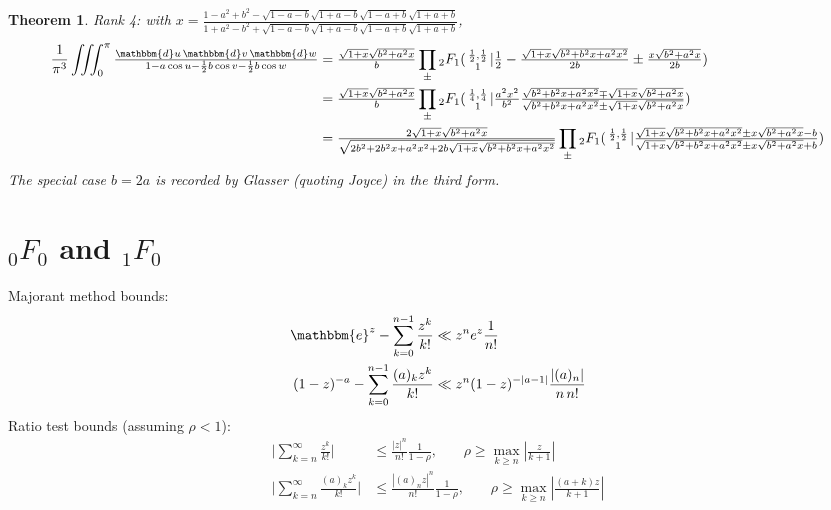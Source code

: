 \documentclass[12pt]{article}
\newcommand{\ee}[0] {\mathbbm{e}}
\newcommand{\dd}[0] {\mathbbm{d}}
\numberwithin{equation}{section}
\newtheorem{theorem}{Theorem}[section]
\newcommand{\Head}[3] {{}_{#1}{#2}_{#3}}
\newcommand{\ArgS}[3] {( \begin{smallmatrix} #1 \\ #2 \end{smallmatrix} | {#3})}
\newcommand{\ArgKS}[1] {\ArgS{\frac12,\frac12}{1}{#1}}
\begin{document}
\begin{theorem} Rank 4: with $x = \tfrac{1-a^2+b^2 - \sqrt{1-a-b} \sqrt{1+a-b} \sqrt{1-a+b} \sqrt{1+a+b}}{1+a^2-b^2 + \sqrt{1-a-b} \sqrt{1+a-b} \sqrt{1-a+b} \sqrt{1+a+b}}$,
\begin{align*}
\frac{1}{\pi^3} \iiint_0^{\pi} \tfrac{\dd u \, \dd v \, \dd w} {1 - a \cos u - \frac12 b \cos v - \frac12 b \cos w} &= \tfrac{\sqrt{1+x}\sqrt{b^2+a^2 x}}{b} \prod_{\pm} \Head{2}{F}{1} \ArgKS{\tfrac{1}{2}-\tfrac{\sqrt{1+x}\sqrt{b^2+b^2 x + a^2 x^2}}{2b} \pm \tfrac{x\sqrt{b^2+a^2 x}}{2b}}\\
&= \tfrac{\sqrt{1+x}\sqrt{b^2+a^2 x}}{b} \prod_{\pm} \Head{2}{F}{1} \ArgS{\frac14,\frac14}{1}{\tfrac{a^2 x^2}{b^2}\tfrac{\sqrt{b^2+b^2 x + a^2 x^2} \mp \sqrt{1+x}\sqrt{b^2+a^2 x}}{\sqrt{b^2+b^2 x + a^2 x^2} \pm \sqrt{1+x}\sqrt{b^2+a^2 x}}}\\
&=\tfrac{2\sqrt{1+x}\sqrt{b^2+a^2 x}}{\sqrt{2b^2 + 2b^2 x + a^2 x^2 + 2b \sqrt{1+x}\sqrt{b^2+b^2 x + a^2 x^2}}} \prod_{\pm} \Head{2}{F}{1} \ArgKS{\tfrac{\sqrt{1+x}\sqrt{b^2+b^2 x+a^2 x^2} \pm x \sqrt{b^2+ a^2 x}-b}{\sqrt{1+x}\sqrt{b^2+b^2 x+a^2 x^2} \pm x \sqrt{b^2+ a^2 x}+b}}
\end{align*}
The special case $b = 2a$ is recorded by Glasser (quoting Joyce) in the third form.
\end{theorem}

\section{${}_0 F_0$ and ${}_1 F_0$}
Majorant method bounds:
\begin{equation}
\label{equ_f0_maj}
\begin{alignedat}{3}
\ee^z - \sum_{k=0}^{n-1} \frac{z^k}{k!} &\ll z^n e^z \frac{1}{n!}\\
(1-z)^{-a} - \sum_{k=0}^{n-1} \frac{(a)_k z^k}{k!} &\ll z^n (1-z)^{-|a-1|} \frac{|(a)_n|}{n \, n!}\\
\end{alignedat}
\end{equation}
Ratio test bounds (assuming $\rho < 1$):
\begin{equation}
\begin{alignedat}{3}
\Big| \sum_{k=n}^{\infty} \frac{z^k}{k!} \Big| &\le \frac{|z|^n}{n!} \frac{1}{1-\rho}\text{,} \quad \quad \rho \ge \max_{k \ge n} | \tfrac{z}{k+1} | \\
\Big|\sum_{k=n}^{\infty} \frac{(a)_k z^k}{k!} \Big| &\le \frac{|(a)_n z|^n}{n!} \frac{1}{1-\rho}\text{,} \quad \quad \rho \ge \max_{k \ge n} | \tfrac{(a+k)z}{k+1} | \\
\end{alignedat}
\end{equation}
\end{document}
